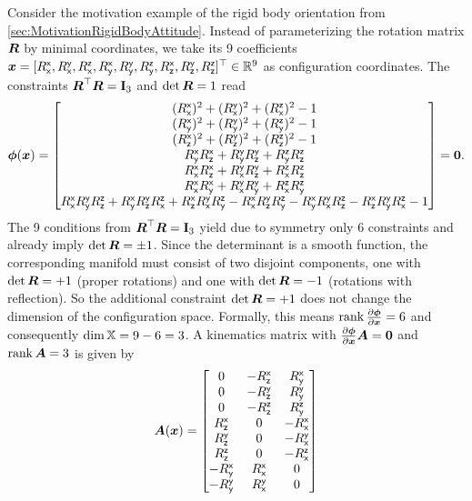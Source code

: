 \begin{Example}\label{Example:KinMatSO3}
Consider the motivation example of the rigid body orientation from \autoref{sec:MotivationRigidBodyAttitude}.
Instead of parameterizing the rotation matrix $\R$ by minimal coordinates, we take its 9 coefficients $\sysCoord = [\Rxx, \Ryx, \Rzx, \Rxy, \Ryy, \Rzy, \Rxz, \Ryz, \Rzz]^\top \in \RealNum^{9}$ as configuration coordinates.
The constraints $\R^\top \R = \idMat[3]$ and $\det\R = 1$ read
\begin{align}\label{eq:constraintSO3}
 \geoConstraint(\sysCoord) = 
  \begin{bmatrix}
  (\Rxx)^2 + (\Ryx)^2 + (\Rzx)^2 - 1 \\
  (\Rxy)^2 + (\Ryy)^2 + (\Rzy)^2 - 1 \\
  (\Rxz)^2 + (\Ryz)^2 + (\Rzz)^2 - 1 \\
  \Rxy \Rxz + \Ryy \Ryz + \Rzy \Rzz \\
  \Rxx \Rxz + \Ryx \Ryz + \Rzx \Rzz \\
  \Rxx \Rxy + \Ryx \Ryy + \Rzx \Rzy \\
  \Rxx \Ryy \Rzz + \Rxy \Ryz \Rzx + \Rxz \Ryx \Rzy - \Rxx \Ryz \Rzy - \Rxy \Ryx \Rzz - \Rxz \Ryy \Rzx - 1
 \end{bmatrix}
 = \tuple{0}.
\end{align}
The 9 conditions from $\R^\top \R = \idMat[3]$ yield due to symmetry only 6 constraints and already imply $\det\R = \pm 1$.
Since the determinant is a smooth function, the corresponding manifold must consist of two disjoint components, one with $\det\R = +1$ (proper rotations) and one with $\det\R=-1$ (rotations with reflection).
So the additional constraint $\det\R = +1$ does not change the dimension of the configuration space.
Formally, this means $\rank\pdiff[\geoConstraint]{\sysCoord} = 6$ and consequently $\dim\configSpace = 9-6 = 3$.
A kinematics matrix with $\pdiff[\geoConstraint]{\sysCoord} \kinMat = \mat{0}$ and $\rank\kinMat = 3$ is given by
\begin{align}\label{eq:KinMatSO3}
 \mat{A}(\sysCoord) =
 \begin{bmatrix}
  0 & -\Rxz & \Rxy \\
  0 & -\Ryz & \Ryy \\
  0 & -\Rzz & \Rzy \\
  \Rxz & 0 & -\Rxx \\
  \Ryz & 0 & -\Ryx \\
  \Rzz & 0 & -\Rzx \\
  -\Rxy & \Rxx & 0 \\
  -\Ryy & \Ryx & 0 \\

\end{bmatrix}
\end{align}
\end{Example}
